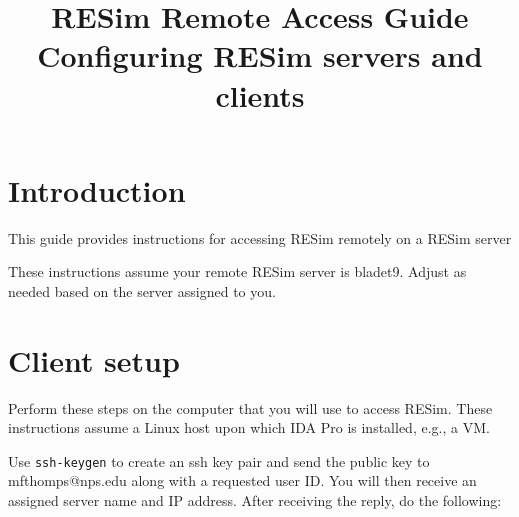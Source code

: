 \documentclass[titlepage]{article}
\begin{document}
\title {%
  RESim Remote Access Guide \\
  \large Configuring RESim servers and clients}
\maketitle
\section{Introduction}

This guide provides instructions for accessing RESim remotely on a RESim server

These instructions assume your remote RESim server is bladet9.  Adjust as needed based on the
server assigned to you.

\section{Client setup}
Perform these steps on the computer that you will use to access RESim.  These instructions
assume a Linux host upon which IDA Pro is installed, e.g., a VM.

Use {\tt ssh-keygen} to create an ssh key pair and send the public key to mfthomps@nps.edu
along with a requested user ID.  You will then receive an assigned server name and IP address.
After receiving the reply, do the following:
\end{document}
